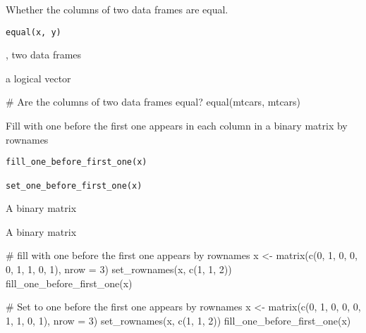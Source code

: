 \documentclass[letterpaper]{book}
\begin{document}
%
\begin{Description}
Whether the columns of two data frames are equal.
\end{Description}
%
\begin{Usage}
\begin{verbatim}
equal(x, y)
\end{verbatim}
\end{Usage}
%
\begin{Arguments}
\begin{ldescription}
\item[\code{x}, \code{y}] two data frames
\end{ldescription}
\end{Arguments}
%
\begin{Value}
a logical vector
\end{Value}
%
\begin{Examples}
\begin{ExampleCode}
# Are the columns of two data frames equal?
equal(mtcars, mtcars)

\end{ExampleCode}
\end{Examples}
%
\begin{Description}
Fill with one before the first one appears in each column in a binary matrix
by rownames
\end{Description}
%
\begin{Usage}
\begin{verbatim}
fill_one_before_first_one(x)

set_one_before_first_one(x)
\end{verbatim}
\end{Usage}
%
\begin{Arguments}
\begin{ldescription}
\item[\code{x}] A binary matrix
\end{ldescription}
\end{Arguments}
%
\begin{Value}
A binary matrix
\end{Value}
%
\begin{Examples}
\begin{ExampleCode}
# fill with one before the first one appears by rownames
x <- matrix(c(0, 1, 0, 0, 0, 1, 1, 0, 1), nrow = 3)
set_rownames(x, c(1, 1, 2))
fill_one_before_first_one(x)

# Set to one before the first one appears by rownames
x <- matrix(c(0, 1, 0, 0, 0, 1, 1, 0, 1), nrow = 3)
set_rownames(x, c(1, 1, 2))
fill_one_before_first_one(x)

\end{ExampleCode}
\end{Examples}
\end{document}
